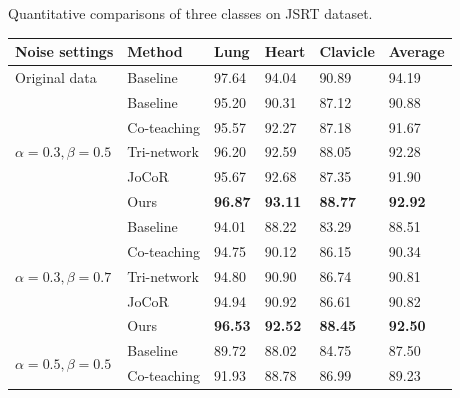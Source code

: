     \begin{table}[thb]
        {Quantitative comparisons of three classes on JSRT dataset.}
        \label{tab:jsrt}
        \centering
        \resizebox{1.0\textwidth}{!}
        {
            \renewcommand{\arraystretch}{0.7}
            \begin{tabular}{P{3.0cm}|M{3.0cm}|M{2.0cm}|M{2.0cm}|M{2.0cm}|M{2.0cm}} %
                \toprule
                Noise settings & Method    & Lung & Heart & Clavicle & Average     \\ \midrule
                Original data & Baseline & 97.64 & 94.04 & 90.89 & 94.19     \\ \midrule
                & Baseline  & 95.20  & 90.31  &87.12   & 90.88   \\ 
                & Co-teaching  & 95.57  & 92.27  &87.18   & 91.67   \\ 
                & Tri-network  & 96.20  & 92.59  &88.05   & 92.28   \\ 
                & JoCoR  & 95.67 & 92.68  &87.35   & 91.90  \\ 
                & Ours  & \textbf{96.87}  & \textbf{93.11}  &\textbf{88.77 }  &  \textbf{92.92}  \\ \midrule
                & Baseline  & 94.01  & 88.22  &83.29   & 88.51   \\ 
                & Co-teaching  & 94.75  &90.12   &86.15   & 90.34   \\ 
                & Tri-network  & 94.80  &90.90   &86.74   & 90.81   \\ 
                & JoCoR  & 94.94  &90.92   &86.61   & 90.82   \\ 
                & Ours  & \textbf{96.53}  &\textbf{92.52}   &\textbf{88.45}   &  \textbf{92.50}  \\ \midrule
                & Baseline  &89.72   &88.02   &84.75   & 87.50   \\ 
                & Co-teaching  &91.93   &88.78   &86.99   & 89.23   \\ 

\end{tabular}}
\end{table}
